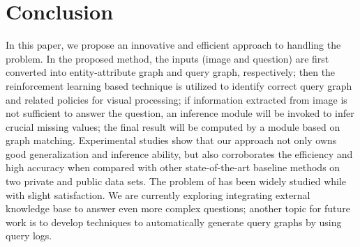 \section{Conclusion}
\label{sec-conclusion}
%


In this paper, we propose an innovative and efficient approach to handling the \vqa problem. In the proposed method, the inputs (image and question) are first converted into entity-attribute graph and query graph, respectively; then the reinforcement learning based technique is utilized to identify correct query graph and related policies for visual processing; if information extracted from image is not sufficient to answer the question, an inference module will be invoked to infer crucial missing values; the final result will be computed by a module based on graph matching. Experimental studies show that our approach not only owns good generalization and inference ability, but also corroborates the efficiency and high accuracy when compared with other state-of-the-art baseline methods on two private and public \vqa data sets. The problem of \vqa has been widely studied while with slight satisfaction. We are currently exploring integrating external knowledge base to answer even more complex questions; another topic for future work is to develop techniques to automatically generate query graphs by using query logs. 


